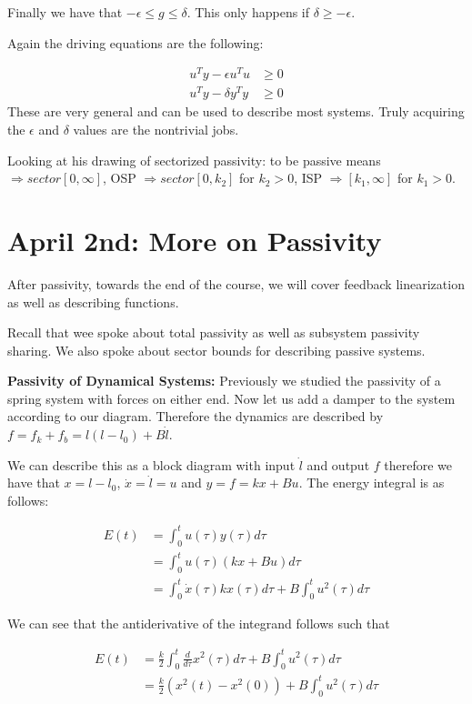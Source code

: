 \documentclass[11pt]{article}
\begin{document}
Finally we have that $-\epsilon \leq g \leq \delta$. This only happens if $\delta \geq - \epsilon$.

Again the driving equations are the following: 

\begin{align}
	u^Ty - \epsilon u^Tu & \geq 0 \\
	u^Ty - \delta y^Ty & \geq 0
\end{align}
These are very general and can be used to describe most systems. Truly acquiring the $\epsilon$ and $\delta$ values are the nontrivial jobs.

Looking at his drawing of sectorized passivity: to be passive means $\Rightarrow sector[0,\infty]$, OSP $\Rightarrow sector[0,k_2]$ for $k_2 > 0$, ISP $\Rightarrow[k_1,\infty]$ for $k_1>0$.




\section*{April 2nd: More on Passivity}
After passivity, towards the end of the course, we will cover feedback linearization as well as describing functions.

Recall that wee spoke about total passivity as well as subsystem passivity sharing. We also spoke about sector bounds for describing passive systems.

\textbf{Passivity of Dynamical Systems: } Previously we studied the passivity of a spring system with forces on either end. Now let us add a damper to the system according to our diagram. Therefore the dynamics are described by $f = f_k + f_b = l(l-l_0) + B\dot{l}$.

 We can describe this as a block diagram with input $\dot{l}$ and output $f$ therefore we have that $x = l-l_0$, $\dot{x} = \dot{l} = u$ and $y = f = kx + Bu$. The energy integral is as follows:

 \begin{align}
 	E(t) &= \int_0^t u(\tau)y(\tau) d\tau \\
 	&= \int_0^t u(\tau)(kx + Bu)d\tau \\
 	&= \int_0^t \dot{x}(\tau)kx(\tau)d\tau + B\int_0^t u^2(\tau)d\tau
 \end{align}

 We can see that the antiderivative of the integrand follows such that 

 \begin{align}
 	E(t) &= \frac{k}{2} \int_0^t \frac{d}{d\tau}x^2(\tau)d\tau + B\int_0^t u^2(\tau)d\tau \\ 
 	&= \frac{k}{2}(x^2(t) - x^2(0)) + B\int_0^t u^2(\tau)d\tau 
 \end{align}
\end{document}
